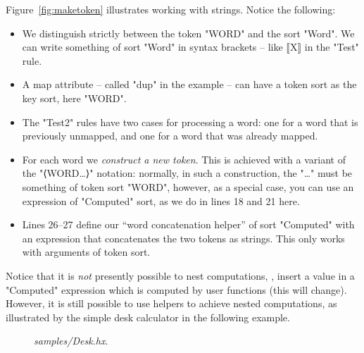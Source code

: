 \documentclass[11pt]{article} %
\begin{document}
\begin{example}
  Figure~\ref{fig:maketoken} illustrates working with strings. Notice the following:
  \begin{itemize}

  \item We distinguish strictly between the token "WORD" and the sort "Word". We can write something
    of sort "Word" in syntax brackets -- like ⟦X⟧ in the "Test" rule.

  \item A map attribute -- called "dup" in the example -- can have a token sort as the key sort,
    here "WORD".

  \item The "Test2" rules have two cases for processing a word: one for a word that is previously
    unmapped, and one for a word that was already mapped.

  \item For each word we \emph{construct a new token}. This is achieved with a variant of the
    "⟨WORD…⟩" notation: normally, in such a construction, the "…" must be something of token sort
    "WORD", however, as a special case, you can use an expression of "Computed" sort, as we do in
    lines 18 and 21 here.

  \item Lines 26--27 define our ``word concatenation helper'' of sort "Computed" with an expression
    that concatenates the two tokens as strings. This only works with arguments of token sort.

  \end{itemize}
\end{example}

Notice that it is \emph{not} presently possible to nest computations, \ie, insert a value in a
"Computed" expression which is computed by user functions (this will change). However, it is still
possible to use helpers to achieve nested computations, as illustrated by the simple desk calculator
in the following example.

\begin{figure}[p]
  \caption{\emph{samples/Desk.hx}.}
  \label{fig:desk}
\end{figure}

\end{document}
